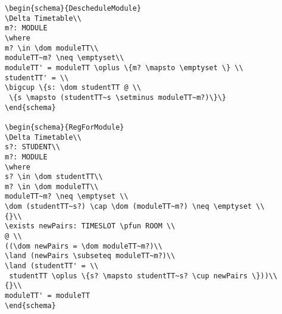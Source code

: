\begin{verbatim}
\begin{schema}{DescheduleModule}
\Delta Timetable\\
m?: MODULE
\where
m? \in \dom moduleTT\\
moduleTT~m? \neq \emptyset\\
moduleTT' = moduleTT \oplus \{m? \mapsto \emptyset \} \\
studentTT' = \\
\bigcup \{s: \dom studentTT @ \\
 \{s \mapsto (studentTT~s \setminus moduleTT~m?)\}\}
\end{schema}

\begin{schema}{RegForModule}
\Delta Timetable\\
s?: STUDENT\\
m?: MODULE
\where
s? \in \dom studentTT\\
m? \in \dom moduleTT\\
moduleTT~m? \neq \emptyset \\
\dom (studentTT~s?) \cap \dom (moduleTT~m?) \neq \emptyset \\
{}\\
\exists newPairs: TIMESLOT \pfun ROOM \\
@ \\
((\dom newPairs = \dom moduleTT~m?)\\
\land (newPairs \subseteq moduleTT~m?)\\
\land (studentTT' = \\
 studentTT \oplus \{s? \mapsto studentTT~s? \cup newPairs \}))\\
{}\\
moduleTT' = moduleTT
\end{schema}



\end{verbatim}